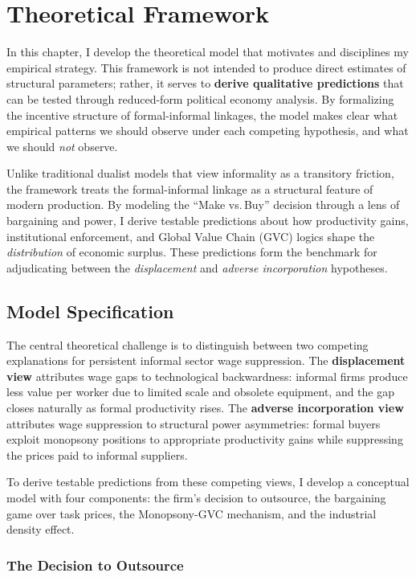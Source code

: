 \chapter{Theoretical Framework}\label{chap:theory}

In this chapter, I develop the theoretical model that motivates and disciplines my empirical strategy. This framework is not intended to produce direct estimates of structural parameters; rather, it serves to \textbf{derive qualitative predictions} that can be tested through reduced-form political economy analysis. By formalizing the incentive structure of formal-informal linkages, the model makes clear what empirical patterns we should observe under each competing hypothesis, and what we should \textit{not} observe.

Unlike traditional dualist models that view informality as a transitory friction, the framework treats the formal-informal linkage as a structural feature of modern production. By modeling the ``Make vs.\,Buy'' decision through a lens of bargaining and power, I derive testable predictions about how productivity gains, institutional enforcement, and Global Value Chain (GVC) logics shape the \textit{distribution} of economic surplus. These predictions form the benchmark for adjudicating between the \textit{displacement} and \textit{adverse incorporation} hypotheses.

\section{Model Specification}
The central theoretical challenge is to distinguish between two competing explanations for persistent informal sector wage suppression. The \textbf{displacement view} attributes wage gaps to technological backwardness: informal firms produce less value per worker due to limited scale and obsolete equipment, and the gap closes naturally as formal productivity rises. The \textbf{adverse incorporation view} attributes wage suppression to structural power asymmetries: formal buyers exploit monopsony positions to appropriate productivity gains while suppressing the prices paid to informal suppliers.

To derive testable predictions from these competing views, I develop a conceptual model with four components: the firm's decision to outsource, the bargaining game over task prices, the Monopsony-GVC mechanism, and the industrial density effect.

\subsection{The Decision to Outsource}

